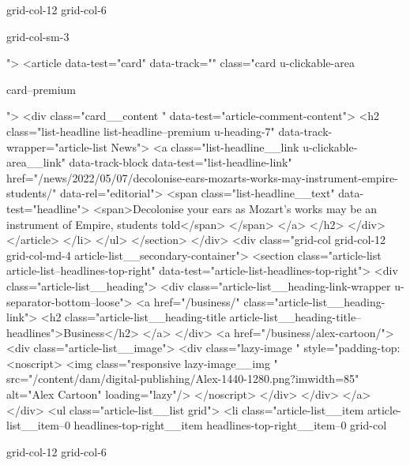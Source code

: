 {{{			
			
			grid-col-12
			grid-col-6
			
			
			
			
			
			grid-col-sm-3
			
			
			
			
			
			
			
			
			">
<article data-test="card" data-track="" class="card
			u-clickable-area
			
			
			card--premium
			
			
			
			
			
			 ">
<div class="card__content " data-test="article-comment-content">
<h2 class="list-headline list-headline--premium u-heading-7" data-track-wrapper="article-list News">
<a class="list-headline__link u-clickable-area__link" data-track-block data-test="list-headline-link" href="/news/2022/05/07/decolonise-ears-mozarts-works-may-instrument-empire-students/" data-rel="editorial">
<span class="list-headline__text" data-test="headline">
<span>Decolonise your ears as Mozart’s works may be an instrument of Empire, students told</span>
</span>
</a>
</h2>
</div>
</article>
</li>
</ul>
</section>
</div>
<div class="grid-col grid-col-12 grid-col-md-4 article-list__secondary-container">
<section class="article-list article-list--headlines-top-right" data-test="article-list-headlines-top-right">
<div class="article-list__heading">
<div class="article-list__heading-link-wrapper
				u-separator-bottom--loose">
<a href="/business/" class="article-list__heading-link">
<h2 class="article-list__heading-title article-list__heading-title--headlines">Business</h2>
</a>
</div>
<a href="/business/alex-cartoon/">
<div class="article-list__image">
<div class="lazy-image   " style="padding-top:%
<noscript>
<img class="responsive lazy-image__img " src="/content/dam/digital-publishing/Alex-1440-1280.png?imwidth=85" alt="Alex Cartoon" loading="lazy"/>
</noscript>
</div>
</div>
</a>
</div>
<ul class="article-list__list grid">
<li class="article-list__item article-list__item--0 headlines-top-right__item headlines-top-right__item--0
			grid-col
			
			
			
			grid-col-12
			grid-col-6
			
			
			
}}}
